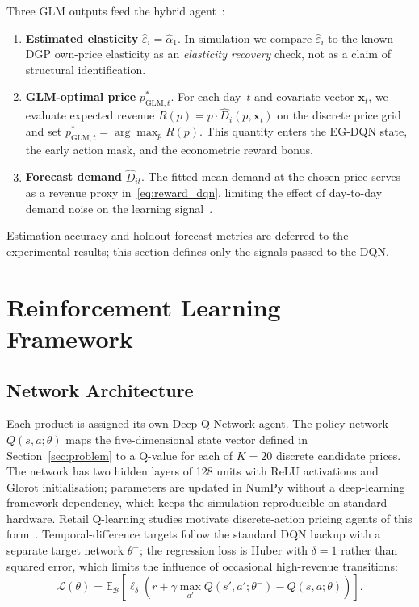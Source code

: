 \documentclass[journal, 10pt, twoside]{IEEEtran}
\begin{document}
Three GLM outputs feed the hybrid agent~\cite{safonov2024}:
\begin{enumerate}
  \item \textbf{Estimated elasticity}
    $\hat{\varepsilon}_i = \hat{\alpha}_1$.
    In simulation we compare $\hat{\varepsilon}_i$ to the known DGP
    own-price elasticity as an \emph{elasticity recovery} check, not as
    a claim of structural identification.
  \item \textbf{GLM-optimal price} $p^*_{\text{GLM},t}$.
    For each day~$t$ and covariate vector $\mathbf{x}_t$, we evaluate
    expected revenue $R(p)=p\cdot\hat{D}_i(p,\mathbf{x}_t)$ on the
    discrete price grid and set $p^*_{\text{GLM},t}=\arg\max_p R(p)$.
    This quantity enters the EG-DQN state, the early action mask, and
    the econometric reward bonus.
  \item \textbf{Forecast demand} $\hat{D}_{it}$.
    The fitted mean demand at the chosen price serves as a revenue
    proxy in~\eqref{eq:reward_dqn}, limiting the effect of day-to-day
    demand noise on the learning signal~\cite{bu2023}.
\end{enumerate}
Estimation accuracy and holdout forecast metrics are deferred to the
experimental results; this section defines only the signals passed to
the DQN.

\section{Reinforcement Learning Framework}
\label{sec:rl}

\subsection{Network Architecture}

Each product is assigned its own Deep Q-Network agent.
The policy network $Q(s,a;\theta)$ maps the five-dimensional state
vector defined in Section~\ref{sec:problem} to a Q-value for each of
$K=20$ discrete candidate prices.
The network has two hidden layers of 128 units with ReLU activations
and Glorot initialisation; parameters are updated in NumPy without a
deep-learning framework dependency, which keeps the simulation
reproducible on standard hardware.
Retail Q-learning studies motivate discrete-action pricing agents of
this form~\cite{apte2024, alamdar2024}.
Temporal-difference targets follow the standard DQN backup with a
separate target network $\theta^-$; the regression loss is Huber with
$\delta=1$ rather than squared error, which limits the influence of
occasional high-revenue transitions:
\begin{equation}
  \mathcal{L}(\theta) = \mathbb{E}_{\mathcal{B}}
  \!\left[\ell_\delta\!\!\left(r + \gamma\max_{a'}
  Q(s',a';\theta^{-}) - Q(s,a;\theta)\right)\right].
  \label{eq:bellman}
\end{equation}
\end{document}
